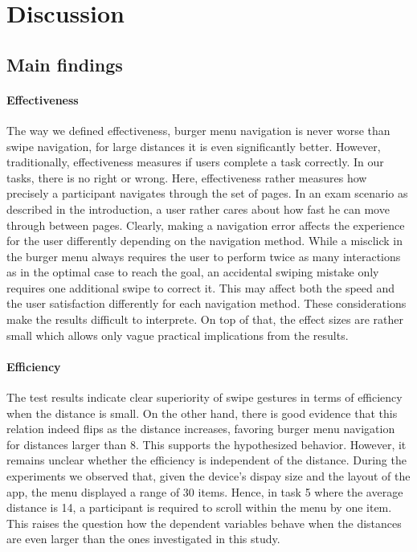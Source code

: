 \documentclass{sig-alternate-05-2015}
\begin{document}
\section{Discussion}
\subsection{Main findings}
\paragraph{Effectiveness}
The way we defined effectiveness, burger menu navigation is never worse than swipe navigation, for large distances it is even significantly better. However,
traditionally, effectiveness measures if users complete a task correctly. In our tasks, there is no right or wrong. Here, effectiveness rather measures 
how precisely a participant navigates through the set of pages. In an exam scenario as described in the introduction, a user rather cares about
how fast he can move through between pages. Clearly, making a navigation error affects the experience for the user differently depending on the navigation method.
While a misclick in the burger menu always requires the user to perform twice as many interactions as in the optimal case to reach the goal, an accidental
swiping mistake only requires one additional swipe to correct it. This may affect both the speed and the user satisfaction differently for each navigation method.
These considerations make the results difficult to interprete. On top of that, the effect sizes are rather small which allows only vague practical implications
from the results.
\paragraph{Efficiency}
The test results indicate clear superiority of swipe gestures in terms of efficiency when the distance is small. On the other hand, there is good evidence that
this relation indeed flips as the distance increases, favoring burger menu navigation for distances larger than 8. This supports the hypothesized behavior. However,
it remains unclear whether the efficiency is independent of the distance. During the experiments we observed that, given the device's dispay size and the layout of
the app, the menu displayed a range of 30 items. Hence, in task 5 where the average distance is 14, a participant is required to scroll within the menu by one item.
This raises the question how the dependent variables behave when the distances are even larger than the ones investigated in this study.
\end{document}
